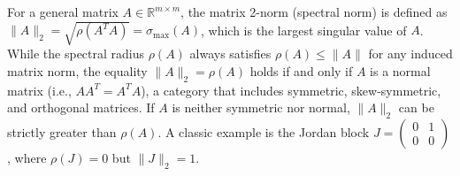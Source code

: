\begin{solution}
\begin{remark}
For a general matrix $A \in \mathbb{R}^{m \times m}$, the matrix 2-norm (spectral norm) is defined as $\|A\|_2 = \sqrt{\rho(A^T A)} = \sigma_{\max}(A)$, which is the largest singular value of $A$. While the spectral radius $\rho(A)$ always satisfies $\rho(A) \leq \|A\|$ for any induced matrix norm, the equality $\|A\|_2 = \rho(A)$ holds if and only if $A$ is a normal matrix (i.e., $AA^T = A^T A$), a category that includes symmetric, skew-symmetric, and orthogonal matrices. If $A$ is neither symmetric nor normal, $\|A\|_2$ can be strictly greater than $\rho(A)$. A classic example is the Jordan block $J = \begin{pmatrix} 0 & 1 \\ 0 & 0 \end{pmatrix}$, where $\rho(J) = 0$ but $\|J\|_2 = 1$.
\end{remark}
\end{solution}

